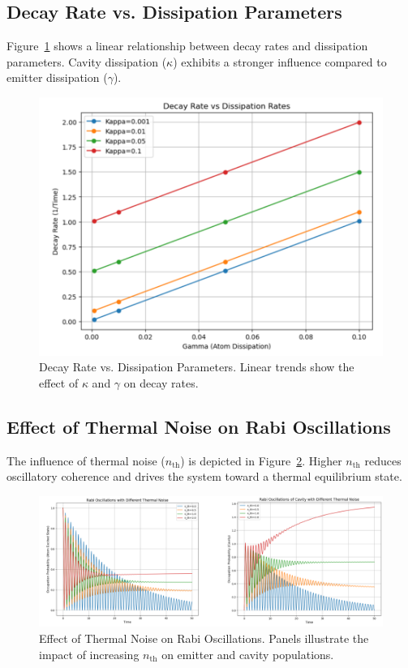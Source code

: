 \documentclass[conference]{IEEEtran}
\begin{document}
\subsection{Decay Rate vs. Dissipation Parameters}

Figure~\ref{fig:decay_vs_dissipation} shows a linear relationship between decay rates and dissipation parameters. Cavity dissipation ($\kappa$) exhibits a stronger influence compared to emitter dissipation ($\gamma$).

\begin{figure}[h!]
    \centering
    \includegraphics[width=0.8\linewidth]{4.png}
    \caption{Decay Rate vs. Dissipation Parameters. Linear trends show the effect of $\kappa$ and $\gamma$ on decay rates.}
    \label{fig:decay_vs_dissipation}
\end{figure}

\subsection{Effect of Thermal Noise on Rabi Oscillations}

The influence of thermal noise ($n_{\text{th}}$) is depicted in Figure~\ref{fig:thermal_noise}. Higher $n_{\text{th}}$ reduces oscillatory coherence and drives the system toward a thermal equilibrium state.

\begin{figure}[h!]
    \centering
    \includegraphics[width=0.8\linewidth]{5.png}
    \caption{Effect of Thermal Noise on Rabi Oscillations. Panels illustrate the impact of increasing $n_{\text{th}}$ on emitter and cavity populations.}
    \label{fig:thermal_noise}
\end{figure}
\end{document}
